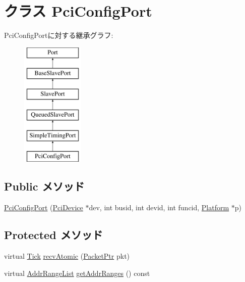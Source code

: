 \hypertarget{classPciDevice_1_1PciConfigPort}{
\section{クラス PciConfigPort}
\label{classPciDevice_1_1PciConfigPort}
}
PciConfigPortに対する継承グラフ:\begin{figure}[H]
\begin{center}
\leavevmode
\includegraphics[height=6cm]{classPciDevice_1_1PciConfigPort}
\end{center}
\end{figure}
\subsection*{Public メソッド}
\begin{DoxyCompactItemize}
\item 
\hyperlink{classPciDevice_1_1PciConfigPort_add98ce4360ec75b21c2f357b7a233acf}{PciConfigPort} (\hyperlink{classPciDevice}{PciDevice} $\ast$dev, int busid, int devid, int funcid, \hyperlink{classPlatform}{Platform} $\ast$p)
\end{DoxyCompactItemize}
\subsection*{Protected メソッド}
\begin{DoxyCompactItemize}
\item 
virtual \hyperlink{base_2types_8hh_a5c8ed81b7d238c9083e1037ba6d61643}{Tick} \hyperlink{classPciDevice_1_1PciConfigPort_a5f0b4c4a94f6b0053f9d7a4eb9c2518a}{recvAtomic} (\hyperlink{classPacket}{PacketPtr} pkt)
\item 
virtual \hyperlink{classstd_1_1list}{AddrRangeList} \hyperlink{classPciDevice_1_1PciConfigPort_a36cf113d5e5e091ebddb32306c098fae}{getAddrRanges} () const 
\end{DoxyCompactItemize}
